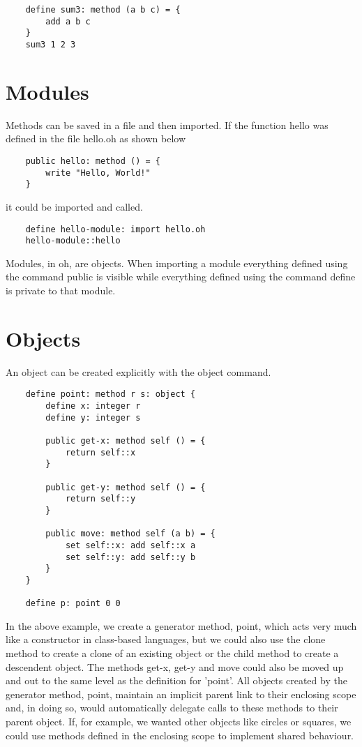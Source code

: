 \documentclass[12pt]{book}
\begin{document}
\begin{lstlisting}
	define sum3: method (a b c) = {
		add a b c
	}
	sum3 1 2 3
\end{lstlisting}


\section{Modules}

Methods can be saved in a file and then imported. If the function hello
was defined in the file hello.oh as shown below

\begin{lstlisting}
	public hello: method () = {
		write "Hello, World!"
	}
\end{lstlisting}

it could be imported and called.

\begin{lstlisting}
	define hello-module: import hello.oh
	hello-module::hello
\end{lstlisting}

Modules, in oh, are objects. When importing a module everything defined
using the command public is visible while everything defined using the
command define is private to that module.


\section{Objects}
An object can be created explicitly with the object command.

\begin{lstlisting}
	define point: method r s: object {
		define x: integer r
		define y: integer s

		public get-x: method self () = {
			return self::x
		}

		public get-y: method self () = {
			return self::y
		}

		public move: method self (a b) = {
			set self::x: add self::x a
			set self::y: add self::y b
		}
	}

	define p: point 0 0
\end{lstlisting}

In the above example, we create a generator method, point, which acts
very much like a constructor in class-based languages, but we could also
use the clone method to create a clone of an existing object or the
child method to create a descendent object.  The methods get-x, get-y
and move could also be moved up and out to the same level as the
definition for 'point'. All objects created by the generator method,
point, maintain an implicit parent link to their enclosing scope and,
in doing so, would automatically delegate calls to these methods to their
parent object. If, for example, we wanted other objects like circles
or squares, we could use methods defined in the enclosing scope to
implement shared behaviour.
\end{document}
